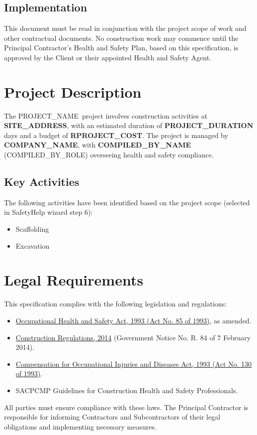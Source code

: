 \documentclass[11pt]{article}
\newcommand{\projectName}{{{PROJECT_NAME}}}
\newcommand{\clientName}{{{COMPANY_NAME}}}
\newcommand{\compilerName}{{{COMPILED_BY_NAME}}}
\newcommand{\compilerRole}{{{COMPILED_BY_ROLE}}}
\newcommand{\projectName}{{{PROJECT_NAME}}}
\newcommand{\clientName}{{{COMPANY_NAME}}}
\newcommand{\compilerName}{{{COMPILED_BY_NAME}}}
\newcommand{\compilerRole}{{{COMPILED_BY_ROLE}}}
\def\activityScaffolding{}
\def\activityExcavation{}
\begin{document}
\subsection{Implementation}
This document must be read in conjunction with the project scope of work and other contractual documents. No construction work may commence until the Principal Contractor’s Health and Safety Plan, based on this specification, is approved by the Client or their appointed Health and Safety Agent.

\section{Project Description}
The \projectName\ project involves construction activities at \textbf{{{{SITE_ADDRESS}}}}, with an estimated duration of \textbf{{{{PROJECT_DURATION}}}} days and a budget of \textbf{R{{{{PROJECT_COST}}}}}. The project is managed by \textbf{\clientName}, with \textbf{\compilerName} (\compilerRole) overseeing health and safety compliance.

\subsection{Key Activities}
The following activities have been identified based on the project scope (selected in SafetyHelp wizard step 6):
\begin{itemize}
  \ifdefined\activityScaffolding
    \item Scaffolding
  \fi
  \ifdefined\activityExcavation
    \item Excavation
  \fi
\end{itemize}

\section{Legal Requirements}
This specification complies with the following legislation and regulations:
\begin{itemize}
  \item \href{https://www.gov.za/documents/occupational-health-and-safety-act}{Occupational Health and Safety Act, 1993 (Act No. 85 of 1993)}, as amended.
  \item \href{https://www.gov.za/documents/occupational-health-and-safety-act-construction-regulations-2014-7-feb-2014-0000}{Construction Regulations, 2014} (Government Notice No. R. 84 of 7 February 2014).
  \item \href{https://www.gov.za/documents/compensation-occupational-injuries-and-diseases-act}{Compensation for Occupational Injuries and Diseases Act, 1993 (Act No. 130 of 1993)}.
  \item SACPCMP Guidelines for Construction Health and Safety Professionals.
\end{itemize}
All parties must ensure compliance with these laws. The Principal Contractor is responsible for informing Contractors and Subcontractors of their legal obligations and implementing necessary measures.
\end{document}
